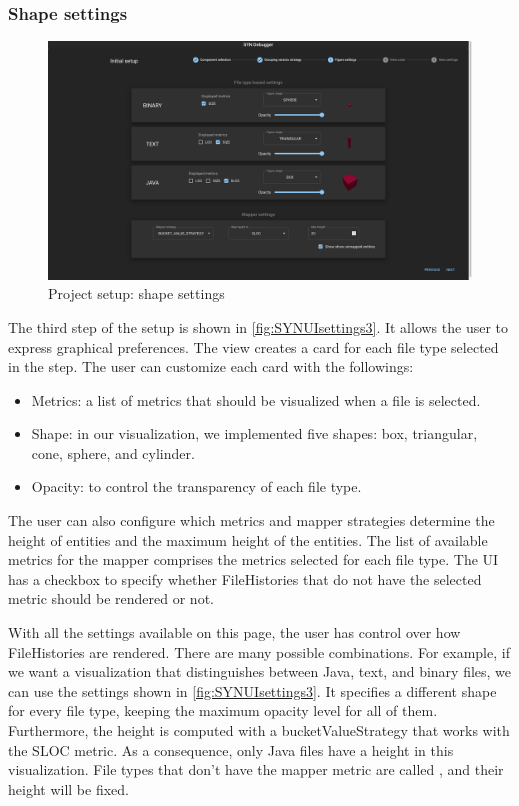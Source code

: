 \subsubsection*{Shape settings}

\begin{figure}[h]
    \center
    \includegraphics[width=\textwidth]{SYNUI-settings3.png}
    \caption{Project setup: shape settings}
    \label{fig:SYNUIsettings3}
\end{figure}

The third step of the setup is shown in \autoref{fig:SYNUIsettings3}. It allows the user to express graphical preferences. 
The view creates a card for each file type selected in the  step.
The user can customize each card with the followings:
\begin{itemize}
    \item Metrics: a list of metrics that should be visualized when a file is selected. 
    \item Shape: in our visualization, we implemented five shapes: box, triangular, cone, sphere, and cylinder. 
    \item Opacity: to control the transparency of each file type.
\end{itemize}

The user can also configure which metrics and mapper strategies determine the height of entities and the maximum height of the entities. 
The list of available metrics for the mapper comprises the metrics selected for each file type.
The UI has a checkbox to specify whether FileHistories that do not have the selected metric should be rendered or not. 

With all the settings available on this page, the user has control over how FileHistories are rendered. 
There are many possible combinations. For example, if we want a visualization that distinguishes between Java, text, and binary files, we can use the settings shown in \autoref{fig:SYNUIsettings3}. It specifies a different shape for every file type, keeping the maximum opacity level for all of them. Furthermore, the height is computed with a bucketValueStrategy that works with the SLOC metric. As a consequence, only Java files have a height in this visualization. File types that don't have the mapper metric are called , and their height will be fixed. 

